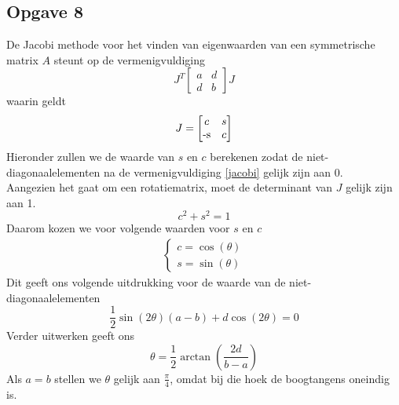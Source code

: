 \documentclass[a4paper, 12pt, titlepage]{report}
\begin{document}
\subsection{Opgave 8}
De Jacobi methode voor het vinden van eigenwaarden van een symmetrische matrix $A$ steunt op de vermenigvuldiging
\begin{equation} \label{jacobi}
 J^T\begin{bmatrix}a & d \\ d & b\end{bmatrix}J
\end{equation}
waarin geldt
\begin{equation} \label{Jacobimatrix}
 J=\begin{bmatrix}c & s\\ $-s$ & c\end{bmatrix}
\end{equation}
Hieronder zullen we de waarde van $s$ en $c$ berekenen zodat de niet-diagonaalelementen na de vermenigvuldiging \eqref{jacobi} gelijk zijn aan 0. \\
Aangezien het gaat om een rotatiematrix, moet de determinant van $J$ gelijk zijn aan 1.
\begin{equation}
 c^2+s^2=1
\end{equation}
Daarom kozen we voor volgende waarden voor $s$ en $c$
\begin{equation}
\begin{align}
 \begin{cases}
  c=\cos(\theta)\\
  s=\sin(\theta)
 \end{cases}
 \end{align}
\end{equation}
Dit geeft ons volgende uitdrukking voor de waarde van de niet-diagonaalelementen
\begin{equation} 
 \frac{1}{2}\sin(2\theta)(a-b) + d\cos(2\theta) = 0
\end{equation}
Verder uitwerken geeft ons
\begin{equation} \label{berekeningtheta}
 \theta = \frac{1}{2}\arctan(\frac{2d}{b-a})
\end{equation}
Als $a=b$ stellen we $\theta$ gelijk aan $\frac{\pi}{4}$, omdat bij die hoek de boogtangens oneindig is. 
\end{document}
